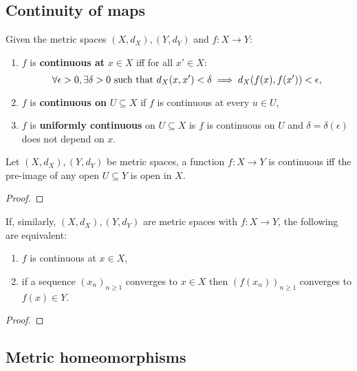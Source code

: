 \documentclass[../Year2.tex]{subfiles}
\begin{document}
\subsection{Continuity of maps}

\begin{definition}
    Given the metric spaces $(X,d_X), (Y,d_Y)$ and $f:X\rightarrow Y$: \begin{enumerate}
        \item $f$ is \textbf{continuous at} $x\in X$ iff for all $x'\in X$: \[
            \forall\epsilon>0, \exists\delta>0 \ \black{such that } d_X(x,x')<\delta \implies d_X(f(x),f(x'))<\epsilon \black{,}
        \] \vspace{-20pt}
        \item $f$ is \textbf{continuous on} $U\subseteq X$ if $f$ is continuous at every $u\in U$,
        \item $f$ is \textbf{uniformly continuous} on $U\subseteq X$ is $f$ is continuous on $U$ and $\delta=\delta(\epsilon)$ does not depend on $x$.
    \end{enumerate}
\end{definition}

\begin{theorem}
    Let $(X,d_X), (Y,d_Y)$ be metric spaces, a function $f:X\rightarrow Y$ is continuous iff the pre-image of any open $U\subseteq Y$ is open in $X$.
    \begin{proof}
        
    \end{proof}
\end{theorem}

\begin{proposition}
    If, similarly, $(X,d_X), (Y,d_Y)$ are metric spaces with $f:X\rightarrow Y$, the following are equivalent: \begin{enumerate}
        \item $f$ is continuous at $x\in X$,
        \item if a sequence ${(x_n)}_{n\geq 1}$ converges to $x\in X$ then ${(f(x_n))}_{n\geq 1}$ converges to $f(x)\in Y$.
    \end{enumerate}
    \begin{proof}
        
    \end{proof}
\end{proposition}

\subsection{Metric homeomorphisms}
\end{document}
